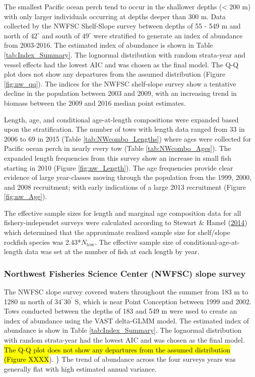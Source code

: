 \documentclass[12pt,]{article}
\begin{document}
The smallest Pacific ocean perch tend to occur in the shallower depths
(\textless{} 200 m) with only larger individuals occurring at depths
deeper than 300 m. Data collected by the NWFSC Shelf-Slope survey
between depths of 55 - 549 m and north of \(42^\circ\) and south of
\(49^\circ\) were stratified to generate an index of abundance from
2003-2016. The estimated index of abundance is shown in Table
\ref{tab:Index_Summary}. The lognormal distribution with random
strata-year and vessel effects had the lowest AIC and was chosen as the
final model. The Q-Q plot does not show any departures from the assumed
distribution (Figure \ref{fig:nw_qq}). The indices for the NWFSC
shelf-slope survey show a tentative decline in the population between
2003 and 2009, with an increasing trend in biomass between the 2009 and
2016 median point estimates.

Length, age, and conditional age-at-length compositions were expanded
based upon the stratification. The number of tows with length data
ranged from 33 in 2006 to 69 in 2015 (Table \ref{tab:NWcombo_Lengths})
where ages were collected for Pacific ocean perch in nearly every tow
(Table \ref{tab:NWcombo_Ages}). The expanded length frequencies from
this survey show an increase in small fish starting in 2010 (Figure
\ref{fig:nw_Length}). The age frequencies provide clear evidence of
large year-classes moving through the population from the 1999, 2000,
and 2008 recruitment; with early indications of a large 2013 recruitment
(Figure \ref{fig:nw_Age}).

The effective sample sizes for length and marginal age composition data
for all fishery-independet surveys were calculated according to Stewart
\& Hamel (\protect\hyperlink{ref-stewart_bootstrapping_2014}{2014})
which determined that the approximate realized sample size for
shelf/slope rockfish species was 2.43*\(N_{\text{tow}}\). The effective
sample size of conditional-age-at-length data was set at the number of
fish at each length by year.

\subsubsection{Northwest Fisheries Science Center (NWFSC) slope
survey}\label{northwest-fisheries-science-center-nwfsc-slope-survey}

The NWFSC slope survey covered waters throughout the summer from 183 m
to 1280 m north of \(34^\circ 30^\prime\) S, which is near Point
Conception between 1999 and 2002. Tows conducted between the depths of
183 and 549 m were used to create an index of abundance using the VAST
delta-GLMM model. The estimated index of abundance is show in Table
\ref{tab:Index_Summary}. The lognormal distribution with random
strata-year had the lowest AIC and was chosen as the final model.
\hl{The Q-Q plot does not show any departures from the assumed distribution (Figure XXXX}).
\} The trend of abundance across the four surveys years was generally
flat with high estimated annual variance.
\end{document}
